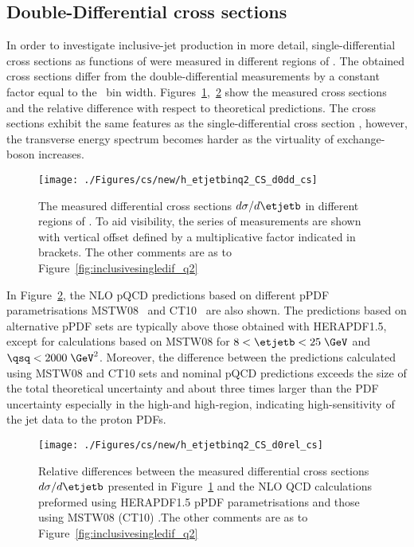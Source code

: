 \subsection{Double-Differential cross sections}
In order to investigate inclusive-jet production in more detail, single-differential cross sections as functions of \etjetb were measured in different regions of \qsq. The obtained cross sections differ from the double-differential measurements by a constant factor equal to the \qsq~bin width. Figures~\ref{fig:inclusive_doubledif},~\ref{fig:inclusive_doubledif_rel} show the measured cross sections and the relative difference with respect to theoretical predictions. The cross sections exhibit the same features as the single-differential cross section \dsdetjetb, however, the transverse energy spectrum becomes harder as the virtuality of exchange-boson increases.
%
\begin{figure}[p]
	\centering
		\texttt{[image: ./Figures/cs/new/h\_etjetbinq2\_CS\_d0dd\_cs]}
	\caption{The measured differential cross sections $d\sigma/d\etjetb$ in different regions of \qsq. To aid visibility, the series of measurements are shown with vertical offset defined by a multiplicative factor indicated in brackets. The other comments are as to Figure~\ref{fig:inclusivesingledif_q2}}
	\label{fig:inclusive_doubledif}
\end{figure}

In Figure~\ref{fig:inclusive_doubledif_rel}, the NLO pQCD predictions based on different pPDF parametrisations MSTW08~\cite{Martin:2009iq} and CT10~\cite{Gao:2013xoa} are also shown. The predictions based on alternative pPDF sets are typically above those obtained with HERAPDF1.5, except for calculations based on MSTW08 for $8 < \etjetb <25\;\GeV$ and $\qsq<2000\;\GeV^2$. Moreover, the difference between the predictions calculated using MSTW08 and CT10 sets and nominal pQCD predictions exceeds the size of the total theoretical uncertainty and about three times larger than the PDF uncertainty especially in the high-\etjetb and high-\qsq region, indicating high-sensitivity of the jet data to the proton PDFs.
\begin{figure}[p]
	\centering
		\texttt{[image: ./Figures/cs/new/h\_etjetbinq2\_CS\_d0rel\_cs]}
  \caption{Relative differences between the measured differential cross sections $d\sigma/d\etjetb$ presented in Figure~\ref{fig:inclusive_doubledif} and the NLO QCD calculations preformed using HERAPDF1.5 pPDF parametrisations and those using MSTW08 (CT10) .The other comments are as to Figure~\ref{fig:inclusivesingledif_q2}}
	\label{fig:inclusive_doubledif_rel}
\end{figure}

